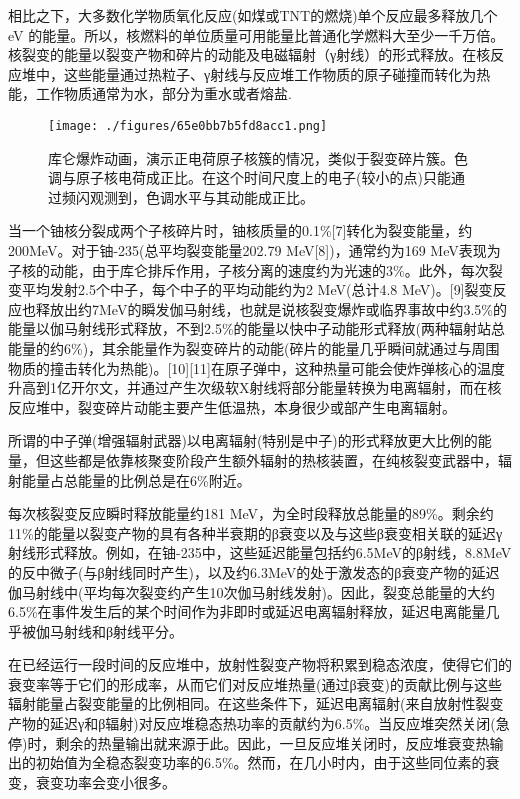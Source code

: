 相比之下，大多数化学物质氧化反应(如煤或TNT的燃烧)单个反应最多释放几个eV 的能量。所以，核燃料的单位质量可用能量比普通化学燃料大至少一千万倍。核裂变的能量以裂变产物和碎片的动能及电磁辐射（γ射线）的形式释放。在核反应堆中，这些能量通过热粒子、γ射线与反应堆工作物质的原子碰撞而转化为热能，工作物质通常为水，部分为重水或者熔盐.
\begin{figure}[ht]
\centering
\texttt{[image: ./figures/65e0bb7b5fd8acc1.png]}
\caption{库仑爆炸动画，演示正电荷原子核簇的情况，类似于裂变碎片簇。色调与原子核电荷成正比。在这个时间尺度上的电子(较小的点)只能通过频闪观测到，色调水平与其动能成正比。} \label{fig_HLB_4}
\end{figure}
当一个铀核分裂成两个子核碎片时，铀核质量的0.1\%[7]转化为裂变能量，约200MeV。对于铀-235(总平均裂变能量202.79 MeV[8])，通常约为169 MeV表现为子核的动能，由于库仑排斥作用，子核分离的速度约为光速的3\%。此外，每次裂变平均发射2.5个中子，每个中子的平均动能约为2 MeV(总计4.8 MeV)。[9]裂变反应也释放出约7MeV的瞬发伽马射线，也就是说核裂变爆炸或临界事故中约3.5\%的能量以伽马射线形式释放，不到2.5\%的能量以快中子动能形式释放(两种辐射站总能量的约6\%)，其余能量作为裂变碎片的动能(碎片的能量几乎瞬间就通过与周围物质的撞击转化为热能)。[10][11]在原子弹中，这种热量可能会使炸弹核心的温度升高到1亿开尔文，并通过产生次级软X射线将部分能量转换为电离辐射，而在核反应堆中，裂变碎片动能主要产生低温热，本身很少或部产生电离辐射。

所谓的中子弹(增强辐射武器)以电离辐射(特别是中子)的形式释放更大比例的能量，但这些都是依靠核聚变阶段产生额外辐射的热核装置，在纯核裂变武器中，辐射能量占总能量的比例总是在6\%附近。

每次核裂变反应瞬时释放能量约181 MeV，为全时段释放总能量的89\%。剩余约11\%的能量以裂变产物的具有各种半衰期的β衰变以及与这些β衰变相关联的延迟γ射线形式释放。例如，在铀-235中，这些延迟能量包括约6.5MeV的β射线，8.8MeV的反中微子(与β射线同时产生)，以及约6.3MeV的处于激发态的β衰变产物的延迟伽马射线中(平均每次裂变约产生10次伽马射线发射)。因此，裂变总能量的大约6.5\%在事件发生后的某个时间作为非即时或延迟电离辐射释放，延迟电离能量几乎被伽马射线和β射线平分。

在已经运行一段时间的反应堆中，放射性裂变产物将积累到稳态浓度，使得它们的衰变率等于它们的形成率，从而它们对反应堆热量(通过β衰变)的贡献比例与这些辐射能量占裂变能量的比例相同。在这些条件下，延迟电离辐射(来自放射性裂变产物的延迟γ和β辐射)对反应堆稳态热功率的贡献约为6.5\%。当反应堆突然关闭(急停)时，剩余的热量输出就来源于此。因此，一旦反应堆关闭时，反应堆衰变热输出的初始值为全稳态裂变功率的6.5\%。然而，在几小时内，由于这些同位素的衰变，衰变功率会变小很多。

